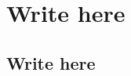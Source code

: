 \documentclass{article}
\begin{document}
\section{Write here}

\subsection{Write here}

\end{document}
